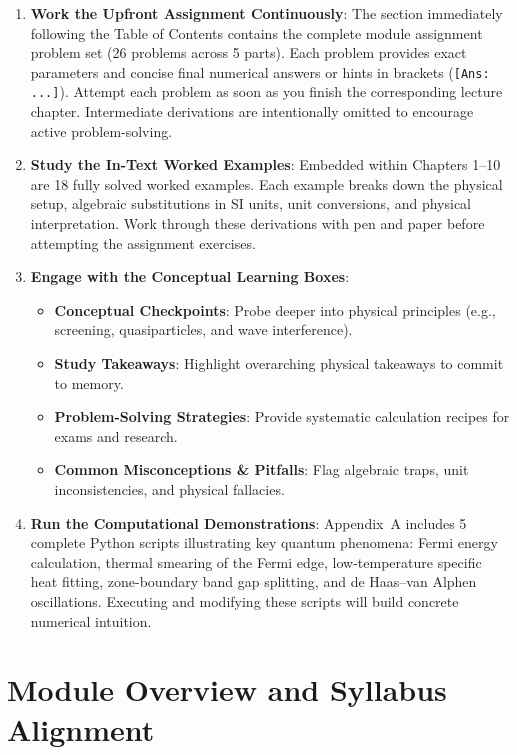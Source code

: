 \documentclass[11pt,a4paper]{article}
\begin{document}
\begin{enumerate}[leftmargin=*]
    \item \textbf{Work the Upfront Assignment Continuously}: The section immediately following the Table of Contents contains the complete module assignment problem set (26 problems across 5 parts). Each problem provides exact parameters and concise final numerical answers or hints in brackets (\texttt{[Ans: ...]}). Attempt each problem as soon as you finish the corresponding lecture chapter. Intermediate derivations are intentionally omitted to encourage active problem-solving.
    \item \textbf{Study the In-Text Worked Examples}: Embedded within Chapters 1--10 are 18 fully solved worked examples. Each example breaks down the physical setup, algebraic substitutions in SI units, unit conversions, and physical interpretation. Work through these derivations with pen and paper before attempting the assignment exercises.
    \item \textbf{Engage with the Conceptual Learning Boxes}:
    \begin{itemize}[leftmargin=1.5cm]
        \item \textbf{Conceptual Checkpoints}: Probe deeper into physical principles (e.g., screening, quasiparticles, and wave interference).
        \item \textbf{Study Takeaways}: Highlight overarching physical takeaways to commit to memory.
        \item \textbf{Problem-Solving Strategies}: Provide systematic calculation recipes for exams and research.
        \item \textbf{Common Misconceptions \& Pitfalls}: Flag algebraic traps, unit inconsistencies, and physical fallacies.
    \end{itemize}
    \item \textbf{Run the Computational Demonstrations}: Appendix~A includes 5 complete Python scripts illustrating key quantum phenomena: Fermi energy calculation, thermal smearing of the Fermi edge, low-temperature specific heat fitting, zone-boundary band gap splitting, and de Haas--van Alphen oscillations. Executing and modifying these scripts will build concrete numerical intuition.
\end{enumerate}

\vspace{0.3cm}

\section{Module Overview and Syllabus Alignment}
\label{sec:overview}
\end{document}
